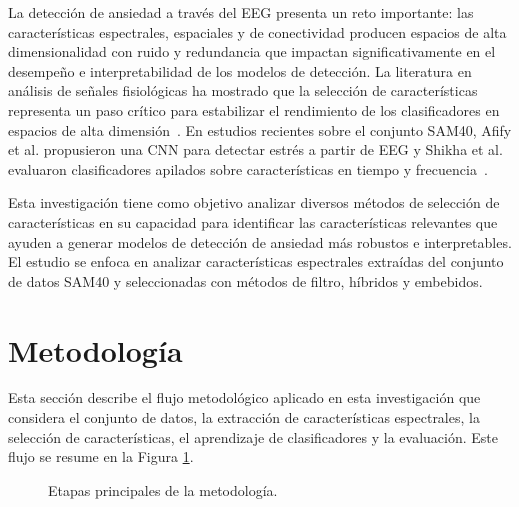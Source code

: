 \documentclass[runningheads]{llncs}
\begin{document}
La detección de ansiedad a través del EEG presenta un reto importante: las características espectrales, espaciales y de conectividad producen espacios de alta dimensionalidad con ruido y redundancia que impactan significativamente en el desempeño e interpretabilidad de los modelos de detección. La literatura en análisis de señales fisiológicas ha mostrado que la selección de características representa un paso crítico para estabilizar el rendimiento de los clasificadores en espacios de alta dimensión~\cite{Acharya2014}. En estudios recientes sobre el conjunto SAM40, Afify et al. propusieron una CNN para detectar estrés a partir de EEG y Shikha et al. evaluaron clasificadores apilados sobre características en tiempo y frecuencia~\cite{Afify2025,Shikha2025}.

Esta investigación tiene como objetivo analizar diversos métodos de selección de características en su capacidad para identificar las características relevantes que ayuden a generar modelos de detección de ansiedad más robustos e interpretables. El estudio se enfoca en analizar características espectrales extraídas del conjunto de datos SAM40 \cite{SAM40Figshare2021} y seleccionadas con métodos de filtro, híbridos y embebidos. 

\section{Metodología}
Esta sección describe el flujo metodológico aplicado en esta investigación que considera el conjunto de datos, la extracción de características espectrales, la selección de características, el aprendizaje de clasificadores y la evaluación. Este flujo se resume en la Figura \ref{fig:flujo_metodologia}.

\begin{figure}[H]
\centering
{}
\caption{Etapas principales de la metodología.\label{fig:flujo_metodologia}}
\end{figure}
\end{document}
